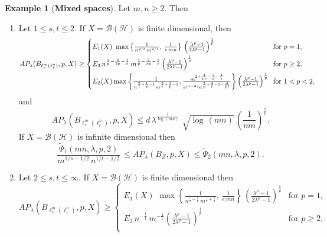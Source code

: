 \documentclass[a4paper,11pt, reqno]{amsart}
\theoremstyle{definition}
\newtheorem{example}{Example}[section]
\begin{document}
	\begin{example}[{\bf Mixed spaces}]
		Let $m,n \geq 2$. Then
		\begin{enumerate}
			\item Let $1 \leq s ,t \leq 2$. If $X=\mathcal{B}(\mathcal{H})$ is finite dimensional, then
			\begin{equation*}
				AP_{\lambda}(B_{\ell^m_s(\ell^n_t)}, p,X) \geq	\begin{cases}
					E_{1}(X)\,  \, \max \left\{\frac{1}{n^{2/t}\,m^{2/s}}, \, \frac{1}{e\,mn }\right\}\, \left(\frac{\lambda^p -1}{2\lambda^p - 1}\right)^{\frac{1}{p}} & \text{for $p=1$}, \\[2mm]
					E_{3}\, n^{\frac{1}{p}-\frac{2}{tp}-\frac{1}{t}}\,m^{\frac{1}{p}-\frac{2}{sp}-\frac{1}{s}} \left(\frac{\lambda^p -1}{2\lambda^p - 1}\right)^{\frac{1}{p}}\, & \text{for $p \geq 2$}, \\[2mm]
					
					E_{2}(X)  \max \left\{\frac{1}{ n^{\frac{2}{t}+\frac{1}{p}-1}m^{\frac{2}{s}+\frac{1}{p}-1}},  \frac{m^{2+\frac{4}{ps}-\frac{3}{p}-\frac{4}{s}}}{e^{(1-\theta)} n^{\frac{3}{p}+\frac{4}{t} -2-\frac{4}{pt}}}\right\}\left(\frac{\lambda^p -1}{2\lambda^p - 1}\right)^{\frac{1}{p}} \hspace{-1mm} & \text{for $1<p< 2$}, 
				\end{cases}
			\end{equation*}
			and 
			$$AP_{\lambda}(B_{\ell^m_s(\ell^n_t)}, p,X) \leq d\,  \lambda^{\frac{1}{\log\,(mn)}}\,\, \sqrt{\log \, (mn)} \, \left(\frac{1}{mn}\right)^{\frac{1}{p}}.
			$$
			If $X=\mathcal{B}(\mathcal{H})$ is infinite dimensional then
			$$\frac{\tilde{\Psi}_{1}(mn,\lambda,p,2)}{m^{1/s -1/2}\,n^{1/t-1/2}} \, \leq AP_{\lambda}(B_{Z}, p,X) \leq  \tilde{\Psi}_{2}(mn,\lambda,p,2).
			$$ 
			\item Let $2 \leq s,t \leq \infty$. If $X=\mathcal{B}(\mathcal{H})$ is finite dimensional then
			\begin{equation*}
				AP_{\lambda}(B_{\ell^m_s(\ell^n_t)}, p,X) \geq	\begin{cases}
					E_{1}(X)\,  \, \max \left\{\frac{1}{n^{\frac{1}{2}+\frac{1}{t}}\, m^{\frac{1}{2}+\frac{1}{s}}}, \, \frac{1}{e\, mn}\right\}\, \left(\frac{\lambda^p -1}{2\lambda^p - 1}\right)^{\frac{1}{p}} & \text{for $p=1$}, \\[2mm]
					E_{3}\, n^{-\frac{1}{t}}\, m^{-\frac{1}{s}}\left(\frac{\lambda^p -1}{2\lambda^p - 1}\right)^{\frac{1}{p}}\, & \text{for $p \geq 2$}, \\[2mm]
					

\end{cases}
\end{equation*}
\end{enumerate}
\end{example}
\end{document}
